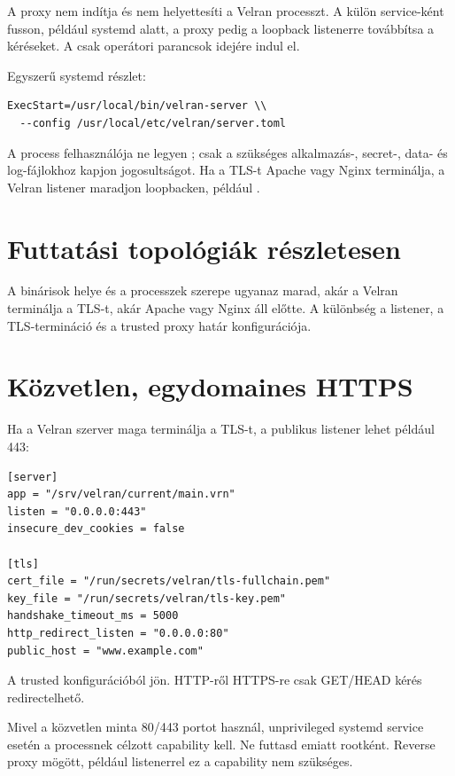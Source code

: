 A proxy nem indítja és nem helyettesíti a Velran processzt. A  külön service-ként fusson, például systemd alatt, a proxy pedig a loopback listenerre továbbítsa a kéréseket. A  csak operátori parancsok idejére indul el.

Egyszerű systemd  részlet:

\begin{lstlisting}
ExecStart=/usr/local/bin/velran-server \\
  --config /usr/local/etc/velran/server.toml
\end{lstlisting}

A process felhasználója ne legyen ; csak a szükséges alkalmazás-, secret-, data- és log-fájlokhoz kapjon jogosultságot. Ha a TLS-t Apache vagy Nginx terminálja, a Velran listener maradjon loopbacken, például .

\section{Futtatási topológiák részletesen}

A binárisok helye és a processzek szerepe ugyanaz marad, akár a Velran terminálja a TLS-t, akár Apache vagy Nginx áll előtte. A különbség a listener, a TLS-termináció és a trusted proxy határ konfigurációja.

\section{Közvetlen, egydomaines HTTPS}

Ha a Velran szerver maga terminálja a TLS-t, a publikus listener lehet például 443:

\begin{lstlisting}
[server]
app = "/srv/velran/current/main.vrn"
listen = "0.0.0.0:443"
insecure_dev_cookies = false

[tls]
cert_file = "/run/secrets/velran/tls-fullchain.pem"
key_file = "/run/secrets/velran/tls-key.pem"
handshake_timeout_ms = 5000
http_redirect_listen = "0.0.0.0:80"
public_host = "www.example.com"
\end{lstlisting}

A  trusted konfigurációból jön. HTTP-ről HTTPS-re csak GET/HEAD kérés redirectelhető.

Mivel a közvetlen minta 80/443 portot használ, unprivileged systemd service esetén a processnek célzott  capability kell. Ne futtasd emiatt rootként. Reverse proxy mögött, például  listenerrel ez a capability nem szükséges.

